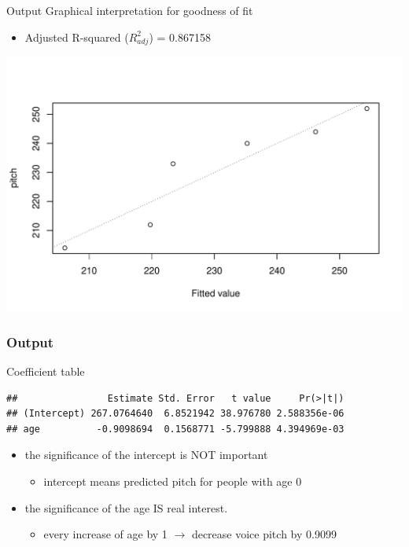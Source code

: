 \documentclass[10p]{beamer}\usepackage[]{graphicx}\usepackage[]{color}
\makeatletter
\def\maxwidth{ %
  \ifdim\Gin@nat@width>\linewidth
    \linewidth
  \else
    \Gin@nat@width
  \fi
}
\newenvironment{kframe}{%
 \def\at@end@of@kframe{}%
 \ifinner\ifhmode%
  \def\at@end@of@kframe{\end{minipage}}%
  \begin{minipage}{\columnwidth}%
 \fi\fi%
 \def\FrameCommand##1{\hskip\@totalleftmargin \hskip-\fboxsep
 \colorbox{shadecolor}{##1}\hskip-\fboxsep
     \hskip-\linewidth \hskip-\@totalleftmargin \hskip\columnwidth}%
 \MakeFramed {\advance\hsize-\width
   \@totalleftmargin\z@ \linewidth\hsize
   \@setminipage}}%
 {\par\unskip\endMakeFramed%
 \at@end@of@kframe}
\newenvironment{knitrout}{}{} %
\makeatother
\begin{document}
\begin{frame}[fragile]{Output}
Graphical interpretation for goodness of fit
\begin{itemize}
\item Adjusted R-squared ($R^2_{adj}$) = 0.867158
\end{itemize}

\begin{knitrout}
\color{fgcolor}
\includegraphics[width=\maxwidth]{figure/unnamed-chunk-17-1} 

\end{knitrout}

\end{frame}

\begin{frame}[fragile]
\frametitle{Output}
Coefficient table
\begin{knitrout}\scriptsize
{}\color{fgcolor}\begin{kframe}
\begin{verbatim}
##                Estimate Std. Error   t value     Pr(>|t|)
## (Intercept) 267.0764640  6.8521942 38.976780 2.588356e-06
## age          -0.9098694  0.1568771 -5.799888 4.394969e-03
\end{verbatim}
\end{kframe}
\end{knitrout}
\begin{itemize}
\item the significance of the intercept is NOT important
	\begin{itemize}
	\item intercept means predicted pitch for people with age 0
	\end{itemize}
\item the significance of the age IS real interest.
	\begin{itemize}
	\item every increase of age by 1 $\rightarrow$ decrease voice pitch by 0.9099
	\end{itemize}

\end{itemize}
\end{frame}
\end{document}
